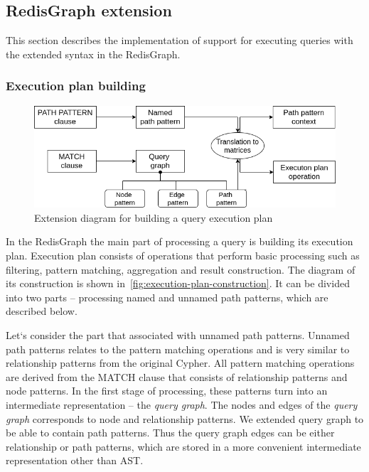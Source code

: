 \subsection{RedisGraph extension}
This section describes the implementation of support for executing queries with the extended syntax in the RedisGraph. 

\subsubsection{Execution plan building}
\begin{figure}[h]
  \centering
  \includegraphics[width=\linewidth]{execution-plan-building.png}
  \caption{Extension diagram for building a query execution plan}
  \label{fig:execution-plan-construction}
\end{figure}

In the RedisGraph the main part of processing a query is building its execution plan. Execution plan consists of operations that perform basic processing such as filtering, pattern matching, aggregation and result construction. The diagram of its construction is shown in~\autoref{fig:execution-plan-construction}. It can be divided into two parts -- processing named and unnamed path patterns, which are described below.

Let`s consider the part that associated with unnamed path patterns. Unnamed path patterns relates to the pattern matching operations and is very similar to relationship patterns from the original Cypher. All pattern matching operations are derived from the MATCH clause that consists of relationship patterns and node patterns. In the first stage of processing, these patterns turn into an intermediate representation -- the \textit{query graph}. The nodes and edges of the \textit{query graph} corresponds to node and relationship patterns. We extended query graph to be able to contain path patterns. Thus the query graph edges can be either relationship or path patterns, which are stored in a more convenient intermediate representation other than AST.

